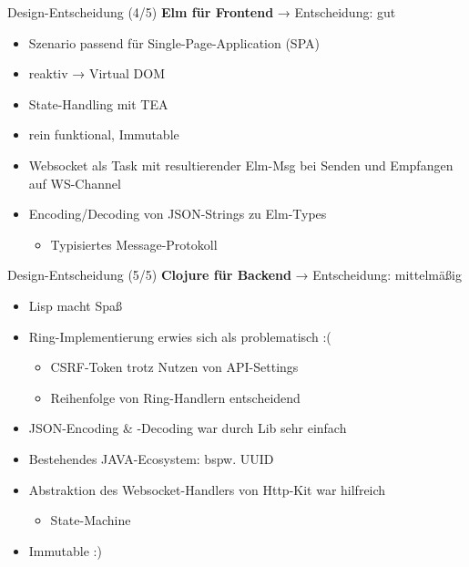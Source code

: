 \documentclass[compress]{beamer}
\begin{document}
\begin{frame}{Design-Entscheidung (4/5)}
  \textbf{Elm für Frontend}
  \hfill
  → Entscheidung: {\color{green} gut}
  \begin{itemize}
    \item Szenario passend für Single-Page-Application (SPA)
    \item reaktiv → Virtual DOM
    \item State-Handling mit TEA
    \item rein funktional, Immutable
    \item Websocket als Task mit resultierender Elm-Msg bei Senden und Empfangen auf WS-Channel
    \item Encoding/Decoding von JSON-Strings zu Elm-Types
      \begin{itemize}
        \item Typisiertes Message-Protokoll
      \end{itemize}
  \end{itemize}
\end{frame}

\begin{frame}{Design-Entscheidung (5/5)}
  \textbf{Clojure für Backend}
  \hfill
  → Entscheidung: {\color{yellow} mittelmäßig}
  \begin{itemize}
    \item Lisp macht Spaß
    \item Ring-Implementierung erwies sich als problematisch :(
      \begin{itemize}
        \item CSRF-Token trotz Nutzen von API-Settings
        \item Reihenfolge von Ring-Handlern entscheidend
      \end{itemize}
    \item JSON-Encoding \& -Decoding war durch Lib sehr einfach
    \item Bestehendes JAVA-Ecosystem: bspw. UUID
    \item Abstraktion des Websocket-Handlers von Http-Kit war hilfreich
      \begin{itemize}
        \item State-Machine
      \end{itemize}
    \item Immutable :)
  \end{itemize}
\end{frame}
\end{document}
